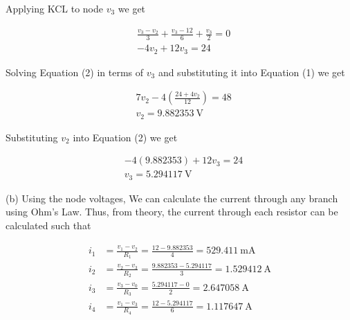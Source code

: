 \documentclass[12pt]{article}
\begin{document}
Applying KCL to node $v_3$ we get

\begin{equation}
    \begin{split}
         &\frac{v_3 - v_2}{3} + \frac{v_3 - 12}{6} + \frac{v_3}{2} = 0 \\
         &-4v_2 + 12v_3 = 24
    \end{split}
\end{equation}

Solving Equation (2) in terms of $v_3$ and substituting it into Equation (1) we get

\begin{equation}
    \begin{split}
         &7v_2 - 4\left(\frac{24+4v_2}{12}\right) = 48 \\
         &v_2 = \SI{9.882353}{\volt}
    \end{split}
\end{equation}

Substituting $v_2$ into Equation (2) we get

\begin{equation}
    \begin{split}
        &-4(9.882353) + 12v_3 = 24 \\
        &v_3 = \SI{5.294117}{\volt}
    \end{split}
\end{equation}

(b) Using the node voltages, We can calculate the current through any branch using Ohm's Law. Thus, from theory, the current through each resistor can be calculated such that

\begin{equation}
    \begin{split}
        i_1 &= \frac{v_1 - v_2}{R_1} = \frac{12 - 9.882353}{4} = \SI{529.411}{\milli\ampere} \\
        i_2 &= \frac{v_2 - v_3}{R_2} = \frac{9.882353 - 5.294117}{3} = \SI{1.529412}{\ampere} \\
        i_3 &= \frac{v_3 - v_0}{R_3} = \frac{5.294117 - 0}{2} = \SI{2.647058}{\ampere} \\
        i_4 &= \frac{v_1 - v_3}{R_4} = \frac{12 - 5.294117}{6} = \SI{1.117647}{\ampere}
    \end{split}
\end{equation}

\pagebreak
\end{document}
